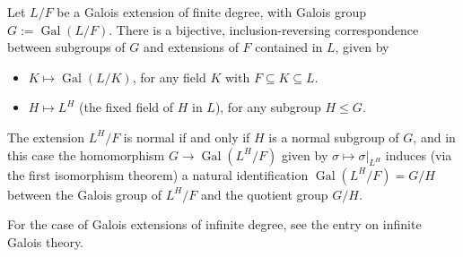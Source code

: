 \documentclass[12pt]{article}
\begin{document}
Let $L/F$ be a Galois extension of finite degree,
with Galois group $G := \operatorname{Gal}(L/F)$.
There is a bijective, inclusion-reversing correspondence
between subgroups of $G$ and extensions of $F$ contained in $L$, given by
\begin{itemize}
\item $K \mapsto \operatorname{Gal}(L/K)$,
       for any field $K$ with $F \subseteq K \subseteq L$.
\item $H \mapsto L^H$ (the fixed field of $H$ in $L$),
       for any subgroup $H \leq G$.
\end{itemize}
The extension $L^H/F$ is normal if and only if $H$ is a normal subgroup of $G$,
and in this case the homomorphism $G \longrightarrow \operatorname{Gal}(L^H/F)$
given by $\sigma \mapsto \sigma|_{L^H}$
induces (via the first isomorphism theorem)
a natural identification $\operatorname{Gal}(L^H/F) = G/H$
between the Galois group of $L^H/F$ and the quotient group $G/H$.

For the case of Galois extensions of infinite degree,
see the entry on infinite Galois theory.
\end{document}
